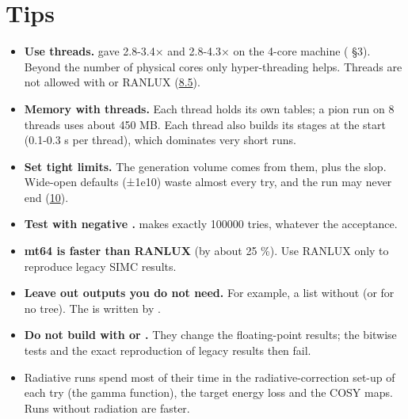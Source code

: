 \section{\texorpdfstring{Tips}{Tips}}\label{user_manual-09u5fperformance:92-tips}
\begin{itemize}
\item \textbf{Use threads.}  gave 2.8-3.4× and  2.8-4.3× on the 4-core machine (
§3). Beyond the number of physical cores only hyper-threading helps. Threads are not allowed with  or
RANLUX (\hyperref[user_manual-08u5frunningu5fandu5freproducibility:85-threads---threads-n]{8.5}).
\item \textbf{Memory with threads.} Each thread holds its own tables; a pion run on 8 threads uses about 450 MB. Each thread also
builds its stages at the start (0.1-0.3 s per thread), which dominates very short runs.
\item \textbf{Set tight  limits.} The generation volume comes from them, plus the slop. Wide-open defaults (±1e10) waste
almost every try, and the run may never end (\hyperref[user_manual-10u5ffaq:the-run-never-ends]{10}).
\item \textbf{Test with negative \hyperref[param:ngen]{}.}  makes exactly 100000 tries, whatever the acceptance.
\item \textbf{mt64 is faster than RANLUX} (by about 25 \%). Use RANLUX only to reproduce legacy SIMC results.
\item \textbf{Leave out outputs you do not need.} For example, a  list without  (or  for no tree).
The  is written by .
\item \textbf{Do not build with  or .} They change the floating-point results; the bitwise tests and
the exact reproduction of legacy results then fail.
\item Radiative runs spend most of their time in the radiative-correction set-up of each try (the gamma function), the
target energy loss and the COSY maps. Runs without radiation are faster.
\end{itemize}
